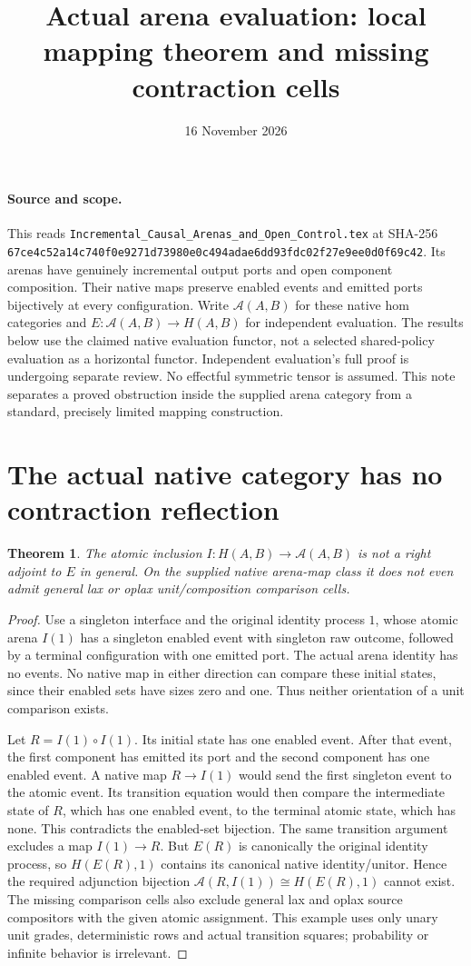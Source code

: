 \documentclass{article}
\title{Actual arena evaluation: local mapping theorem and missing contraction cells}
\date{16 November 2026}
\newtheorem{theorem}{Theorem}
\begin{document}
\maketitle
\paragraph{Source and scope.}
This reads \texttt{Incremental\_Causal\_Arenas\_and\_Open\_Control.tex} at
SHA-256 \texttt{67ce4c52a14c740f0e9271d73980e0c494adae6dd93fdc02f27e9ee0d0f69c42}.
Its arenas have genuinely incremental output ports and open component
composition. Their native maps preserve enabled events and emitted ports
bijectively at every configuration. Write $\mathcal A(A,B)$ for these native
hom categories and $E:\mathcal A(A,B)\to H(A,B)$ for independent evaluation.
The results below use the claimed native evaluation functor, not a selected
shared-policy evaluation as a horizontal functor. Independent evaluation's
full proof is undergoing separate review. No effectful symmetric tensor is
assumed. This note separates a proved obstruction inside the supplied arena
category from a standard, precisely limited mapping construction.

\section{The actual native category has no contraction reflection}
\begin{theorem}
The atomic inclusion $I:H(A,B)\to\mathcal A(A,B)$ is not a right adjoint to
$E$ in general. On the supplied native arena-map class it does not even admit
general lax or oplax unit/composition comparison cells.
\end{theorem}
\begin{proof}
Use a singleton interface and the original identity process $1$, whose
atomic arena $I(1)$ has a singleton enabled event with singleton raw outcome,
followed by a terminal configuration with one emitted port. The actual arena
identity has no events. No native map in either direction can compare these
initial states, since their enabled sets have sizes zero and one.
Thus neither orientation of a unit comparison exists.

Let $R=I(1)\circ I(1)$. Its initial state has one enabled event. After that
event, the first component has emitted its port and the second component has
one enabled event. A native map $R\to I(1)$ would send the first singleton
event to the atomic event. Its transition equation would then compare the
intermediate state of $R$, which has one enabled event, to the terminal
atomic state, which has none. This contradicts the enabled-set bijection.
The same transition argument excludes a map $I(1)\to R$.
But $E(R)$ is canonically the original identity process, so
$H(E(R),1)$ contains its canonical native identity/unitor. Hence the required
adjunction bijection
$\mathcal A(R,I(1))\cong H(E(R),1)$ cannot exist. The missing comparison
cells also exclude general lax and oplax source compositors with the given
atomic assignment. This example uses only unary unit grades, deterministic
rows and actual transition squares; probability or infinite behavior is
irrelevant.
\end{proof}
\end{document}
